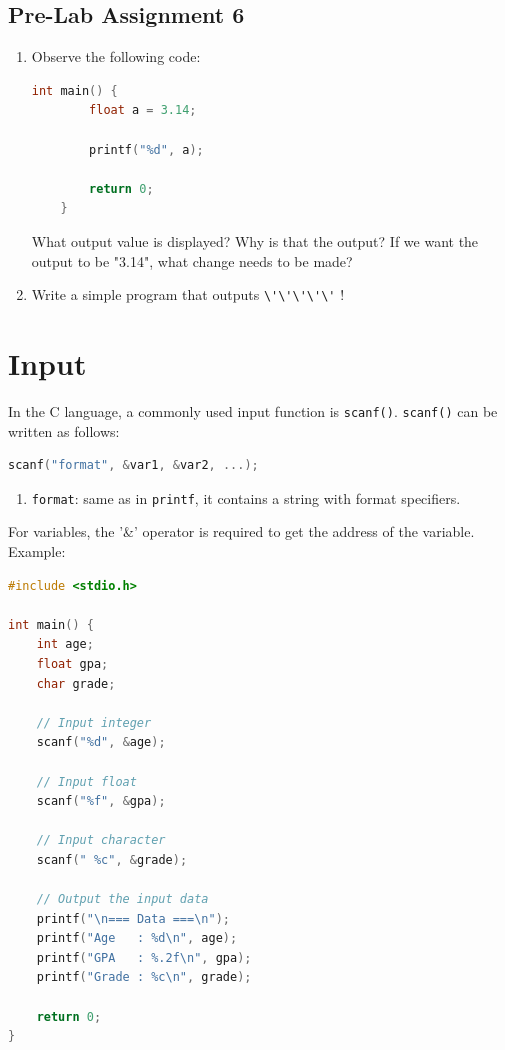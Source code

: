 \subsection*{Pre-Lab Assignment 6}
\begin{enumerate}
    \item Observe the following code:
    \begin{lstlisting}[language=c]
    int main() {
        float a = 3.14;

        printf("%d", a);

        return 0;
    }
    \end{lstlisting}
    What output value is displayed? Why is that the output?  
    If we want the output to be "3.14", what change needs to be made?

    \item Write a simple program that outputs \verb|\'\'\'\'\'| !
\end{enumerate}

\section{Input}

In the C language, a commonly used input function is \verb|scanf()|.  
\verb|scanf()| can be written as follows:

{
\captionsetup[lstlisting]{labelformat=empty, justification=raggedright, singlelinecheck=false} %
\begin{lstlisting}[language=c, caption={Syntax}]
    scanf("format", &var1, &var2, ...);
\end{lstlisting}
}

\begin{enumerate}[label={}, leftmargin=*]
    \item \verb|format|: same as in \verb|printf|, it contains a string with format specifiers.
\end{enumerate}

For variables, the '\&' operator is required to get the address of the variable.  
\\ Example:
\begin{lstlisting}[language=c]
#include <stdio.h>

int main() {
    int age;
    float gpa;
    char grade;

    // Input integer
    scanf("%d", &age);

    // Input float
    scanf("%f", &gpa);

    // Input character
    scanf(" %c", &grade);

    // Output the input data
    printf("\n=== Data ===\n");
    printf("Age   : %d\n", age);
    printf("GPA   : %.2f\n", gpa);
    printf("Grade : %c\n", grade);

    return 0;
}
\end{lstlisting}

